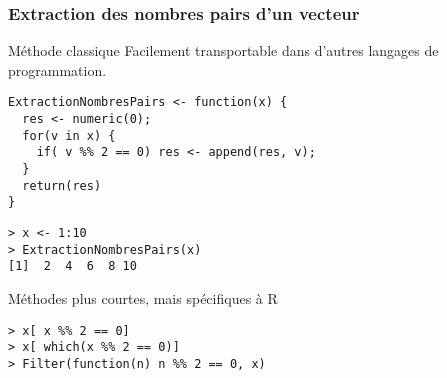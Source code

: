 \documentclass[10pt]{beamer}
\begin{document}
\begin{frame}[fragile]
  \frametitle{Extraction des nombres pairs d'un vecteur}
  \begin{block}{Méthode classique}
    Facilement transportable dans d'autres langages de programmation.
    \begin{lstlisting}[style=editor]
ExtractionNombresPairs <- function(x) {
  res <- numeric(0);
  for(v in x) {
    if( v %% 2 == 0) res <- append(res, v);
  }
  return(res)
}      
\end{lstlisting}
\begin{lstlisting}
> x <- 1:10
> ExtractionNombresPairs(x)
[1]  2  4  6  8 10
\end{lstlisting}
  \end{block}

  \begin{block}{Méthodes plus courtes, mais spécifiques à R}
\begin{lstlisting}[style=block]
> x[ x %% 2 == 0]
> x[ which(x %% 2 == 0)]
> Filter(function(n) n %% 2 == 0, x)
\end{lstlisting}
    
  \end{block}
\end{frame}


\questionSlide

 \appendix
 \backupSlides







\end{document}
